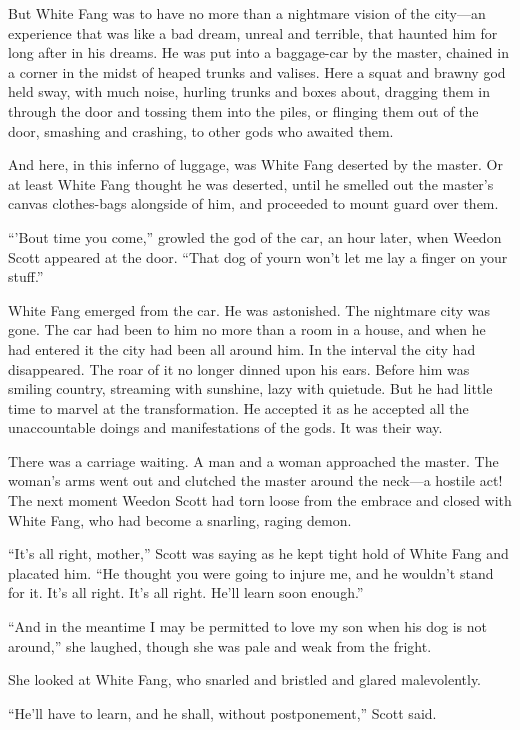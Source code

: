 \documentclass[10pt]{book}
\begin{document}
But White Fang was to have no more than a nightmare vision of the
city—an experience that was like a bad dream, unreal and terrible, that
haunted him for long after in his dreams. He was put into a baggage-car
by the master, chained in a corner in the midst of heaped trunks and
valises. Here a squat and brawny god held sway, with much noise,
hurling trunks and boxes about, dragging them in through the door and
tossing them into the piles, or flinging them out of the door, smashing
and crashing, to other gods who awaited them.

And here, in this inferno of luggage, was White Fang deserted by the
master. Or at least White Fang thought he was deserted, until he
smelled out the master’s canvas clothes-bags alongside of him, and
proceeded to mount guard over them.

“’Bout time you come,” growled the god of the car, an hour later, when
Weedon Scott appeared at the door. “That dog of yourn won’t let me lay
a finger on your stuff.”

White Fang emerged from the car. He was astonished. The nightmare city
was gone. The car had been to him no more than a room in a house, and
when he had entered it the city had been all around him. In the
interval the city had disappeared. The roar of it no longer dinned upon
his ears. Before him was smiling country, streaming with sunshine, lazy
with quietude. But he had little time to marvel at the transformation.
He accepted it as he accepted all the unaccountable doings and
manifestations of the gods. It was their way.

There was a carriage waiting. A man and a woman approached the master.
The woman’s arms went out and clutched the master around the neck—a
hostile act! The next moment Weedon Scott had torn loose from the
embrace and closed with White Fang, who had become a snarling, raging
demon.

“It’s all right, mother,” Scott was saying as he kept tight hold of
White Fang and placated him. “He thought you were going to injure me,
and he wouldn’t stand for it. It’s all right. It’s all right. He’ll
learn soon enough.”

“And in the meantime I may be permitted to love my son when his dog is
not around,” she laughed, though she was pale and weak from the fright.

She looked at White Fang, who snarled and bristled and glared
malevolently.

“He’ll have to learn, and he shall, without postponement,” Scott said.
\end{document}
